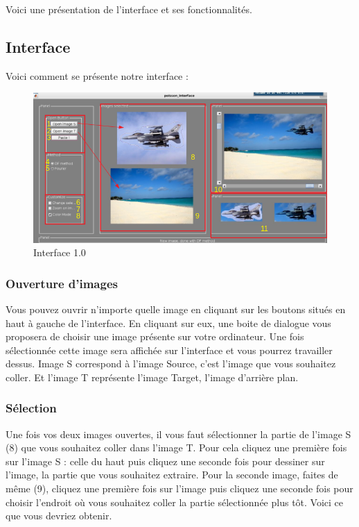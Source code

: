 Voici une présentation de l'interface et ses fonctionnalités.

\subsection{Interface}
Voici comment se présente notre interface : 
\begin{figure}[!h]
    \centering
    \includegraphics[scale = 0.5]{Images/interface.png}
    \caption{Interface 1.0}
\end{figure}{}
\subsubsection{Ouverture d'images}
Vous pouvez ouvrir n'importe quelle image en cliquant sur les boutons situés en haut à gauche de l'interface. En cliquant sur eux, une boite de dialogue vous proposera de choisir une image présente sur votre ordinateur. Une fois sélectionnée cette image sera affichée sur l'interface et vous pourrez travailler dessus. Image S correspond à l'image Source, c'est l'image que vous souhaitez coller. Et l'image T représente l'image Target, l'image d'arrière plan.\newline
\subsubsection{Sélection}
Une fois vos deux images ouvertes, il vous faut sélectionner la partie de l'image S (8) que vous souhaitez coller dans l'image T. Pour cela cliquez une première fois sur l'image S : celle du haut puis cliquez une seconde fois pour dessiner sur l'image, la partie que vous souhaitez extraire. 
\newline
Pour la seconde image, faites de même (9), cliquez une première fois sur l'image puis cliquez une seconde fois pour choisir l'endroit où vous souhaitez coller la partie sélectionnée plus tôt.  Voici ce que vous devriez obtenir. 
